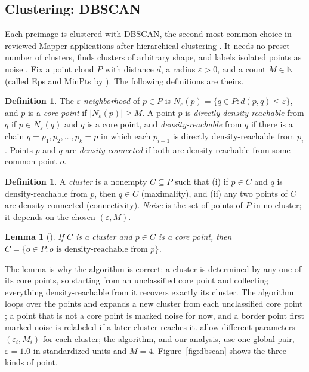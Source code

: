 \documentclass{article}
\newcommand{\N}{\mathbb{N}}
\newtheorem{lemma}[theorem]{Lemma}
\theoremstyle{definition}
\newtheorem{definition}[theorem]{Definition}
\theoremstyle{remark}
\begin{document}
\subsection{Clustering: DBSCAN}\label{sec:dbscan}
Each preimage is clustered with DBSCAN, the second most common choice in reviewed Mapper applications after hierarchical clustering \parencite{madukpe2026review}.
It needs no preset number of clusters, finds clusters of arbitrary shape, and labels isolated points as noise \parencite{ester1996dbscan}.
Fix a point cloud $P$ with distance $d$, a radius $\varepsilon > 0$, and a count $M \in \N$ (called Eps and MinPts by \textcite{ester1996dbscan}). The following definitions are theirs.

\begin{definition}
The \emph{$\varepsilon$-neighborhood} of $p \in P$ is $N_\varepsilon(p) = \{ q \in P : d(p,q) \le \varepsilon \}$, and $p$ is a \emph{core point} if $|N_\varepsilon(p)| \ge M$.
A point $p$ is \emph{directly density-reachable} from $q$ if $p \in N_\varepsilon(q)$ and $q$ is a core point, and \emph{density-reachable} from $q$ if there is a chain $q = p_1, p_2, \dots, p_k = p$ in which each $p_{i+1}$ is directly density-reachable from $p_i$.
Points $p$ and $q$ are \emph{density-connected} if both are density-reachable from some common point $o$.
\end{definition}
\begin{definition}
A \emph{cluster} is a nonempty $C \subseteq P$ such that (i) if $p \in C$ and $q$ is density-reachable from $p$, then $q \in C$ (maximality), and (ii) any two points of $C$ are density-connected (connectivity).
\emph{Noise} is the set of points of $P$ in no cluster; it depends on the chosen $(\varepsilon, M)$.
\end{definition}
\begin{lemma}[{\textcite{ester1996dbscan}}]
If $C$ is a cluster and $p \in C$ is a core point, then $C = \{ o \in P : o \text{ is density-reachable from } p \}$.
\end{lemma}
The lemma is why the algorithm is correct: a cluster is determined by any one of its core points, so starting from an unclassified core point and collecting everything density-reachable from it recovers exactly its cluster. The algorithm loops over the points and expands a new cluster from each unclassified core point \parencite[p.~229]{ester1996dbscan}; a point that is not a core point is marked noise for now, and a border point first marked noise is relabeled if a later cluster reaches it.
\textcite{ester1996dbscan} allow different parameters $(\varepsilon_i, M_i)$ for each cluster; the algorithm, and our analysis, use one global pair, $\varepsilon = 1.0$ in standardized units and $M = 4$.
Figure~\ref{fig:dbscan} shows the three kinds of point.
\end{document}
